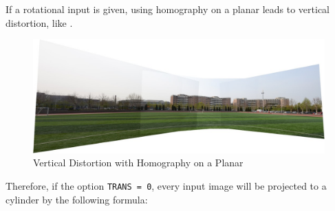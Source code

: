 \begin{enumerate}
    If a rotational input is given, using homography on a planar leads to vertical distortion, like .
    \begin{figure}[H]
      \centering
      \includegraphics[width=\textwidth]{res/distort.png}
      \caption{Vertical Distortion with Homography on a Planar\label{fig:distort}}
    \end{figure}

    Therefore, if the option \verb|TRANS = 0|,
    every input image will be projected to a cylinder by the following formula:


\end{enumerate}

